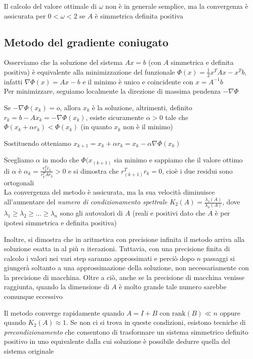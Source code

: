 \documentclass[openany]{book}
\begin{document}
Il calcolo del valore ottimale di $\omega$ non è in generale semplice, ma la convergenza è assicurata per $0<\omega<2$ se $A$ è simmetrica definita positiva
\subsection{Metodo del gradiente coniugato}

Osserviamo che la soluzione del sistema $Ax=b$ (con $A$ simmetrica e definita positiva) è equivalente alla minimizzazione del funzionale $\Phi(x)=\frac{1}{2}x^TAx-x^Tb$, infatti $\nabla\Phi(x)=Ax-b$ e il minimo è unico e coincidente con $x=A^{-1}b$
\\

Per minimizzare, seguiamo localmente la direzione di massima pendenza $-\nabla\Phi$

Se $-\nabla\Phi(x_k)=o$, allora $x_k$ è la soluzione, altrimenti, definito $r_k=b-Ax_k=-\nabla\Phi(x_k)$, esiste sicuramente $\alpha>0$ tale che $\Phi(x_k+\alpha r_k)<\Phi(x_k)$ (in quanto $x_k$ non è il minimo)

Sostituendo otteniamo $x_{k+1}=x_k+\alpha r_k=x_k-\alpha\nabla\Phi(x_k)$

Scegliamo $\alpha$ in modo che $\Phi(x_{(k+1)}$ sia minimo e sappiamo che il valore ottimo di $\alpha$ è $\alpha_k =\frac{r_k^Tr_k}{r_k^TAr_k}>0$ e si dimostra che $r^T_{(k+1)}r_k=0$, cioè i due residui sono ortogonali
\\

La convergenza del metodo è assicurata, ma la sua velocità diminuisce all'aumentare del \textit{numero di condizionamento spettrale} $K_2(A)=\frac{\lambda_1(A)}{\lambda_n(A)}$, dove $\lambda_1\geq\lambda_2\geq...\geq\lambda_n$ sono gli autovalori di $A$ (reali e positivi dato che $A$ è per ipotesi simmetrica e definita positiva)

Inoltre, si dimostra che in aritmetica con precisione infinita il metodo arriva alla soluzione esatta in al più $n$ iterazioni. Tuttavia, con una precisione finita di calcolo i valori nei vari step saranno approssimati e perciò dopo $n$ passaggi si giungerà soltanto a una approssimazione della soluzione, non necessariamente con la precisione di macchina. Oltre a ciò, anche se la precisione di macchina venisse raggiunta, quando la dimensione di $A$ è molto grande tale numero sarebbe comunque eccessivo

Il metodo converge rapidamente quando $A=I+B$ con $\text{rank}(B)\ll n$ oppure quando $K_2(A)\approx 1$. Se non ci si trova in queste condizioni, esistono tecniche di \textit{precondizionamento} che consentono di trasformare un sistema simmetrico definito positivo in uno equivalente dalla cui soluzione è possibile dedurre quella del sistema originale 
\\
\end{document}
